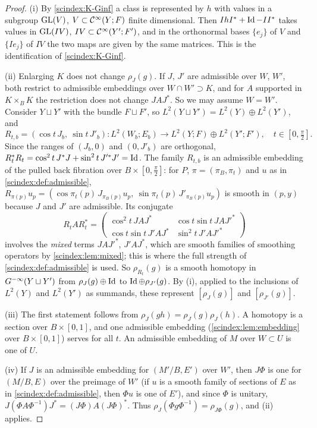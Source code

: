 \begin{proof}
  (i) By \ref{scindex:K-Ginf} a class is represented by $h$ with values in a
  subgroup $\operatorname{GL}(V)$, $V\subset\mathcal{C}^\infty(Y;F)$ finite dimensional. Then $IhI^*+\operatorname{Id}-II^*$
  takes values in $\operatorname{GL}(IV)$, $IV\subset\mathcal{C}^\infty(Y';F')$, and in the orthonormal bases
  $\{e_j\}$ of $V$ and $\{Ie_j\}$ of $IV$ the two maps are given by the same
  matrices. This is the identification of \ref{scindex:K-Ginf}.

  (ii) Enlarging $K$ does not change $\rho_J(g)$. If $J$, $J'$ are admissible over
  $W$, $W'$, both restrict to admissible embeddings over $W\cap W'\supset K$,
  and for $A$ supported in $K\times_BK$ the restriction does not change
  $JAJ^*$. So we may assume $W=W'$. Consider $Y\sqcup Y'$ with the bundle
  $F\sqcup F'$, so $L^2(Y\sqcup Y')=L^2(Y)\oplus L^2(Y')$, and
  \begin{equation*}
    R_{t,b}=(\cos t\,J_b,\ \sin t\,J'_b):L^2(W_b;E_b)\longrightarrow L^2(Y;F)\oplus
    L^2(Y';F'),\quad t\in[0,\tfrac\pi2].
  \end{equation*}
  Since the ranges of $(J_b,0)$ and $(0,J'_b)$ are orthogonal, $R_t^*R_t=
  \cos^2t\,J^*J+\sin^2t\,J'^*J'=\operatorname{Id}$. The family $R_{t,b}$ is an admissible
  embedding of the pulled back fibration over $B\times[0,\frac\pi2]$: for $P$,
  $\pi=(\pi_B,\pi_t)$ and $u$ as in \cref{scindex:def:admissible},
  $R_{\pi(p)}u_p=(\cos\pi_t(p)\,J_{\pi_B(p)}u_p,\ \sin\pi_t(p)\,J'_{\pi_B(p)}u_p)$
  is smooth in $(p,y)$ because $J$ and $J'$ are admissible. Its conjugate
  \begin{equation*}
    R_tAR_t^*=\begin{pmatrix}\cos^2t\,JAJ^*&\cos t\sin t\,JAJ'^*\\
    \cos t\sin t\,J'AJ^*&\sin^2t\,J'AJ'^*\end{pmatrix}
  \end{equation*}
  involves the \emph{mixed} terms $JAJ'^*$, $J'AJ^*$, which are smooth families
  of smoothing operators by \cref{scindex:lem:mixed}; this is where the full
  strength of \cref{scindex:def:admissible} is used. So $\rho_{R_t}(g)$ is a
  smooth homotopy in $G^{-\infty}(Y\sqcup Y')$ from $\rho_J(g)\oplus\operatorname{Id}$ to
  $\operatorname{Id}\oplus\rho_{J'}(g)$. By (i), applied to the
  inclusions of $L^2(Y)$ and $L^2(Y')$ as summands, these represent $[\rho_J(g)]$
  and $[\rho_{J'}(g)]$.

  (iii) The first statement follows from $\rho_J(gh)=\rho_J(g)\rho_J(h)$. A
  homotopy is a section over $B\times[0,1]$, and one admissible embedding
  (\cref{scindex:lem:embedding} over $B\times[0,1]$) serves for all $t$. An
  admissible embedding of $M$ over $W\subset U$ is one of $U$.

  (iv) If $J$ is an admissible embedding for $(M'/B,E')$ over $W'$, then $J\Phi$
  is one for $(M/B,E)$ over the preimage of $W'$ (if $u$ is a smooth family of
  sections of $E$ as in \cref{scindex:def:admissible}, then $\Phi u$ is one of
  $E'$), and since $\Phi$ is unitary,
  $J(\Phi A\Phi^{-1})J^*=(J\Phi)A(J\Phi)^*$. Thus $\rho_J(\Phi g\Phi^{-1})=
  \rho_{J\Phi}(g)$, and (ii) applies.
\end{proof}

